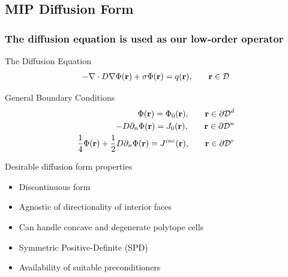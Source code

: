 \documentclass[compress,10pt]{beamer}
\begin{document}
\subsection{MIP Diffusion Form}
\typeout{***********************************************************************************}
\begin{frame}[t]\frametitle{The diffusion equation is used as our low-order operator}\vspace{-2mm}
	\begin{block}{The Diffusion Equation}\vspace{-0.25cm} {\small 
     		\begin{align*}
 	 		{ \small -{\bf \nabla} \cdot D {\bf \nabla} \Phi ({\bf r}) + \sigma \Phi ({\bf r}) = q ({\bf r}), \qquad  {\bf r} \in \mathcal{D} }
        	\end{align*} }\vspace{-0.25cm}
        	\end{block}\vspace{-1mm}
        	\begin{block}{General Boundary Conditions} \vspace{-0.4cm} {\small 
		\begin{align*}
 	 		{ \small \Phi ({\bf r})  = \Phi_0 ({\bf r}) , \qquad {\bf r} \in \partial \mathcal{D}^d } \\
 	 		{ \small -D \partial_n \Phi ({\bf r})  = J_0 ({\bf r}) , \qquad {\bf r} \in \partial \mathcal{D}^n } \\
 	 		{ \small \frac{1}{4} \Phi ({\bf r})  + \frac{1}{2}D \partial_n \Phi ({\bf r})  = J^{inc} ({\bf r}) ,  \qquad {\bf r} \in \partial \mathcal{D}^r}
        		\end{align*} } \vspace{-0.25cm}
    \end{block}\vspace{-1mm}
	\begin{block}{Desirable diffusion form properties} {\small 
	\begin{itemize}
		\item Discontinuous form
		\item Agnostic of directionality of interior faces
		\item Can handle concave and degenerate polytope cells
		\item Symmetric Positive-Definite (SPD) 
		\item Availability of suitable preconditioners
	\end{itemize} }
	\end{block}
\end{frame}
\end{document}
